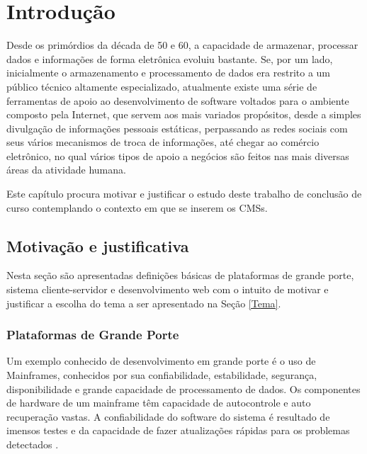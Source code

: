 \chapter[Introdução]{Introdução}

Desde os primórdios da década de 50 e 60, a capacidade de armazenar, processar dados e informações de forma eletrônica evoluiu bastante. Se, por um lado, inicialmente o armazenamento e processamento de dados era restrito a um público técnico altamente especializado, atualmente existe uma série de ferramentas de apoio ao desenvolvimento de software voltados para o ambiente composto pela Internet, que servem aos mais variados propósitos, desde a simples divulgação de informações pessoais estáticas, perpassando as redes sociais com seus vários mecanismos de troca de informações, até chegar ao comércio eletrônico, no qual vários tipos de apoio a negócios são feitos nas mais  diversas áreas da atividade humana. 

Este capítulo procura motivar e justificar o estudo deste trabalho de conclusão de curso contemplando o contexto em que se inserem os CMSs.

\section{Motivação e justificativa}
\label{Contex}
Nesta seção são apresentadas definições básicas de plataformas de grande porte, sistema cliente-servidor e desenvolvimento web com o intuito de motivar e justificar a escolha do tema a ser apresentado na Seção \ref{Tema}.


\subsection{Plataformas de Grande Porte}
\label{Contex}
Um exemplo conhecido de desenvolvimento em grande porte é o uso de Mainframes, conhecidos por sua confiabilidade, estabilidade, segurança, disponibilidade e grande capacidade de processamento de dados. Os componentes de hardware de um mainframe têm capacidade de autocontrole e auto recuperação vastas. A confiabilidade do software do sistema é resultado de imensos testes e da capacidade de fazer atualizações rápidas para os problemas detectados \cite{shu_2013}.
	
